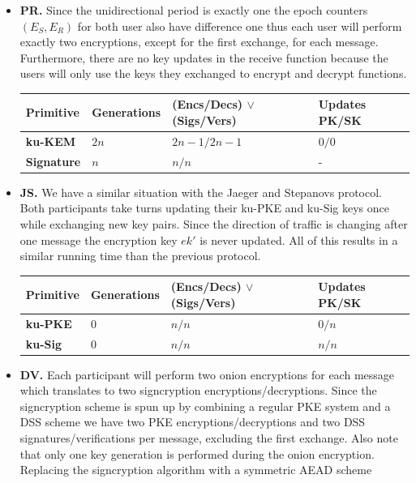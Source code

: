 \documentclass[11pt,a4paper,twoside,openright,bibliography=totoc]{scrbook}
\begin{document}
\begin{itemize}
\item \textbf{PR.} Since the unidirectional period is exactly one
  the epoch counters $(E_S,E_R)$ for both user also have difference one
  thus each user will perform exactly two encryptions, except for the
  first exchange, for each message.
  Furthermore, there are no key updates in the receive function because
  the users will only use the keys they exchanged to encrypt and decrypt
  functions.
  \begin{center}
    \begin{tabular}{ | l | l | l | l |}
    \hline
    Primitive & Generations & (Encs/Decs) $\vee$ (Sigs/Vers) & Updates PK/SK \\ \hline
    \textbf{ku-KEM} & $2n$ & $2n-1/2n-1$ & $0/0$ \\ \hline
    \textbf{Signature} & $n$ & $n/n$ & - \\  
    \hline
    \end{tabular}
  \end{center}
\item \textbf{JS.} We have a similar situation with the Jaeger and Stepanovs
  protocol. Both participants take turns updating their ku-PKE and
  ku-Sig keys once while exchanging new key pairs. Since the direction
  of traffic is changing after one message the encryption key $ek'$
  is never updated. All of this results in a similar running time
  than the previous protocol.
  \begin{center}
    \begin{tabular}{ | l | l | l | l |}
    \hline
    Primitive & Generations & (Encs/Decs) $\vee$ (Sigs/Vers) & Updates PK/SK \\ \hline
    \textbf{ku-PKE} & $0$ & $n/n$ & $0/n$ \\ \hline
    \textbf{ku-Sig} & $0$ & $n/n$ & $n/n$ \\  
    \hline
    \end{tabular}
  \end{center}
\item \textbf{DV.} Each participant will perform two onion encryptions
  for each message which translates to two signcryption
  encryptions/decryptions. Since the signcryption scheme is spun up by combining
  a regular PKE system and a DSS scheme we have two PKE encryptions/decryptions
  and two DSS signatures/verifications per message, excluding
  the first exchange. Also note that
  only one key generation is performed during the onion encryption.
  Replacing the signcryption algorithm with a symmetric AEAD scheme

\end{itemize}
\end{document}
